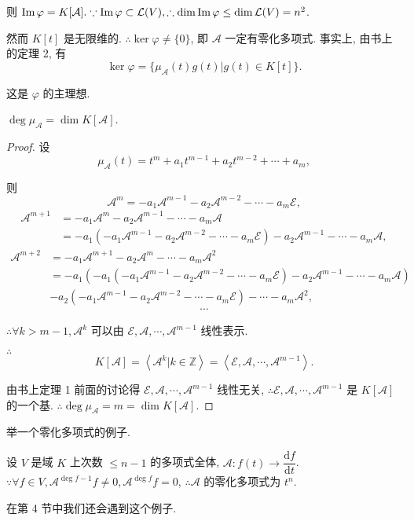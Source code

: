 \documentclass[color=black,device=normal,lang=cn,mode=geye]{elegantnote}
\begin{document}
则 $\operatorname{Im} \varphi=K[\mathcal{A}].\because\operatorname{Im} \varphi\subset\mathcal{L}(V),\therefore\dim\operatorname{Im} \varphi\leq\dim\mathcal{L}(V)=n^2$.

然而 $K[t]$ 是无限维的. $\therefore\ker\varphi\neq\{0\}$, 即 $\mathcal{A}$ 一定有零化多项式. 事实上, 由书上的定理 2, 有
\[\ker\varphi=\{\mu_\mathcal{A}(t)g(t)|g(t)\in K[t]\}.\]

这是 $\varphi$ 的主理想.
\begin{theorem}
    $\deg\mu_\mathcal{A}=\dim K[\mathcal{A}]$.
\end{theorem}
\begin{proof}
    设
    \[\mu_\mathcal{A}(t)=t^m+a_1t^{m-1}+a_2t^{m-2}+\cdots+a_m,\]

    则
    \[\mathcal{A}^m=-a_1\mathcal{A}^{m-1}-a_2\mathcal{A}^{m-2}-\cdots-a_m\mathcal{E},\]
    \begin{align*}
        \mathcal{A}^{m+1} & =-a_1\mathcal{A}^{m}-a_2\mathcal{A}^{m-1}-\cdots-a_m\mathcal{A} \\
        & =-a_1(-a_1\mathcal{A}^{m-1}-a_2\mathcal{A}^{m-2}-\cdots-a_m\mathcal{E})-a_2\mathcal{A}^{m-1}-\cdots-a_m\mathcal{A},
    \end{align*}
    \begin{align*}
        \mathcal{A}^{m+2} & =-a_1\mathcal{A}^{m+1}-a_2\mathcal{A}^m-\cdots-a_m\mathcal{A}^2 \\
        & =-a_1(-a_1(-a_1\mathcal{A}^{m-1}-a_2\mathcal{A}^{m-2}-\cdots-a_m\mathcal{E})-a_2\mathcal{A}^{m-1}-\cdots-a_m\mathcal{A}) \\
        & -a_2(-a_1\mathcal{A}^{m-1}-a_2\mathcal{A}^{m-2}-\cdots-a_m\mathcal{E})-\cdots-a_m\mathcal{A^2},
    \end{align*}
    \[\cdots\]

    $\therefore\forall k>m-1,\mathcal{A}^k$ 可以由 $\mathcal{E},\mathcal{A},\cdots,\mathcal{A}^{m-1}$ 线性表示.

    $\therefore$
    \[K[\mathcal{A}]=\left<\mathcal{A}^k|k\in\mathbb{Z}\right>=\left<\mathcal{E},\mathcal{A},\cdots,\mathcal{A}^{m-1}\right>.\]

    由书上定理 1 前面的讨论得 $\mathcal{E},\mathcal{A},\cdots,\mathcal{A}^{m-1}$ 线性无关, $\therefore\mathcal{E},\mathcal{A},\cdots,\mathcal{A}^{m-1}$ 是 $K[\mathcal{A}]$ 的一个基. $\therefore\deg\mu_\mathcal{A}=m=\dim K[\mathcal{A}]$.
\end{proof}
举一个零化多项式的例子.
\begin{example}\label{ex2.2}
    设 $V$ 是域 $K$ 上次数 $\leq n-1$ 的多项式全体, $\mathcal{A}:f(t)\to\dfrac{\mathrm{d}f}{\mathrm{d}t}$. $\because\forall f\in V,\mathcal{A}^{\deg f-1}f\neq0,\mathcal{A}^{\deg f}f=0$, $\therefore\mathcal{A}$ 的零化多项式为 $t^n$.
\end{example}
在第 4 节中我们还会遇到这个例子.
\end{document}
